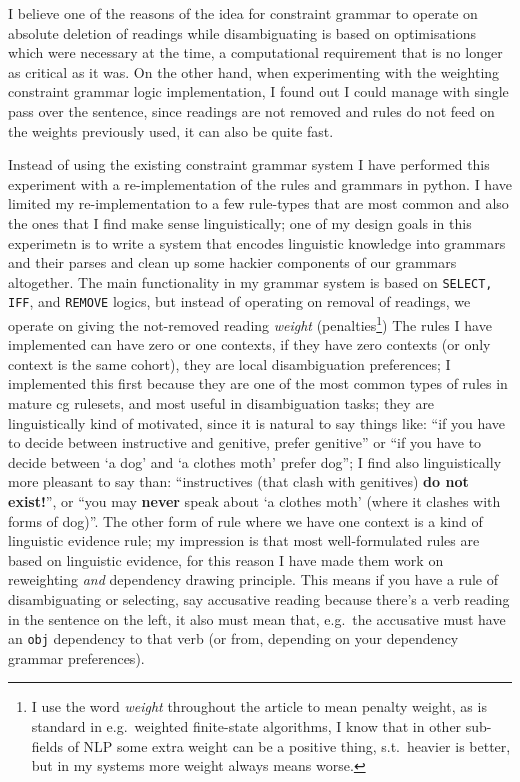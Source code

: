 \documentclass[free]{flammie}
\begin{document}
I believe one of the reasons of the idea for constraint grammar to operate on
absolute deletion of readings while disambiguating is based on optimisations
which were necessary at the time, a computational requirement that is no longer
as critical as it was.  On the other hand, when experimenting with the weighting
constraint grammar logic implementation, I found out I could manage with single
pass over the sentence, since readings are not removed and rules do not feed on
the weights previously used, it can also be quite fast.

Instead of using the existing constraint grammar system I have performed this
experiment with a re-implementation of the rules and grammars in python.  I have
limited my re-implementation to a few rule-types that are most common and also
the ones that I find make sense linguistically; one of my design goals in this
experimetn is to write a system that encodes linguistic knowledge into grammars
and their parses and clean up some hackier components of our grammars
altogether.  The main functionality in my grammar system is based on
\texttt{SELECT, IFF}, and \texttt{REMOVE} logics, but instead of operating on
removal of readings, we operate on giving the not-removed reading
\textit{weight} (penalties\footnote{I use the word \textit{weight} throughout
the article to mean penalty weight, as is standard in e.g.\ weighted finite-state
algorithms, I know that in other sub-fields of NLP some extra weight can be a
positive thing, s.t.\ heavier is better, but in my systems more weight always
means worse.}) The rules I have implemented can have zero or one contexts, if
they have zero contexts (or only context is the same cohort), they are local
disambiguation preferences; I implemented this first because they are one of the
most common types of rules in mature cg rulesets, and most useful in
disambiguation tasks; they are linguistically kind of motivated, since it is
natural to say things like: ``if you have to decide between instructive and
genitive, prefer genitive'' or ``if you have to decide between `a dog' and `a
clothes moth' prefer dog''; I find also linguistically more pleasant to say
than: ``instructives (that clash with genitives) \textbf{do not exist!}'', or
``you may \textbf{never} speak about `a clothes moth' (where it clashes with
forms of dog)''.  The other form of rule where we have one context is a kind of
linguistic evidence rule; my impression is that most well-formulated rules are
based on linguistic evidence, for this reason I have made them work on
reweighting \textit{and} dependency drawing principle.  This means if you have a
rule of disambiguating or selecting, say accusative reading because there's a
verb reading in the sentence on the left, it also must mean that, e.g.\ the
accusative must have an \texttt{obj} dependency to that verb (or from, depending
on your dependency grammar preferences).
\end{document}

